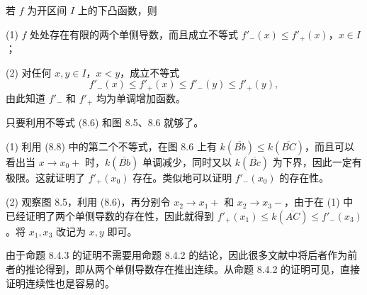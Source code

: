 \begin{xtheorem}[8.4.3]
若 $f$ 为开区间 $I$ 上的下凸函数，则

(1) $f$ 处处存在有限的两个单侧导数，而且成立不等式 $f'_-(x)\le f'_+(x)$，$x\in I$；

(2) 对任何 $x,y\in I$，$x<y$，成立不等式
\[
  f'_-(x)\le f'_+(x)\le f'_-(y)\le f'_+(y),
\]
由此知道 $f'_-$ 和 $f'_+$ 均为单调增加函数。
\end{xtheorem}
\begin{xproof}
只要利用不等式 (8.6) 和图 8.5、8.6 就够了。

(1) 利用 (8.8) 中的第二个不等式，在图 8.6 上有 $k(\overline{Bb})\le k(\overline{BC})$，而且可以看出当 $x\to x_0+$ 时，$k(\overline{Bb})$ 单调减少，同时又以 $k(\overline{Bc})$ 为下界，因此一定有极限。这就证明了 $f'_+(x_0)$ 存在。类似地可以证明 $f'_-(x_0)$ 的存在性。

(2) 观察图 8.5，利用 (8.6)，再分别令 $x_2\to x_1+$ 和 $x_2\to x_3-$，由于在 (1) 中已经证明了两个单侧导数的存在性，因此就得到 $f'_+(x_1)\le k(\overline{AC})\le f'_-(x_3)$。将 $x_1,x_3$ 改记为 $x,y$ 即可。
\end{xproof}

\begin{xremark}
由于命题 8.4.3 的证明不需要用命题 8.4.2 的结论，因此很多文献中将后者作为前者的推论得到，即从两个单侧导数存在推出连续。从命题 8.4.2 的证明可见，直接证明连续性也是容易的。
\end{xremark}

